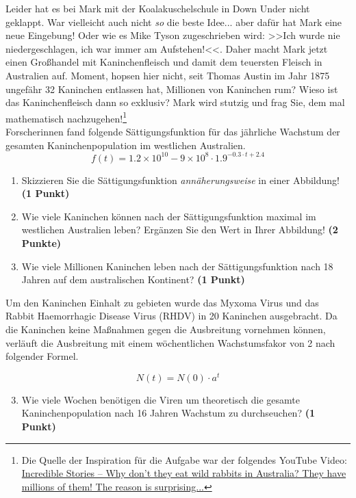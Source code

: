 \documentclass[a4paper, 9pt]{scrartcl}\usepackage[]{graphicx}\usepackage[]{xcolor}
\begin{document}
Leider hat es bei Mark mit der Koalakuschelschule in Down Under nicht geklappt. War vielleicht auch nicht \textit{so} die beste Idee... aber dafür hat Mark eine neue Eingebung! Oder wie es Mike Tyson zugeschrieben wird: >>Ich wurde nie niedergeschlagen, ich war immer am Aufstehen!<<. Daher macht Mark jetzt einen Großhandel mit Kaninchenfleisch und damit dem teuersten Fleisch in Australien auf. Moment, hopsen hier nicht, seit Thomas Austin im Jahr 1875 ungefähr 32 Kaninchen entlassen hat, Millionen von Kaninchen rum? Wieso ist das Kaninchenfleisch dann so exklusiv? Mark wird stutzig und frag Sie, dem mal mathematisch nachzugehen!\footnote{Die Quelle der Inspiration für die Aufgabe war der folgendes YouTube Video: \href{https://youtu.be/38fuOr3tdgc?si=Li7NL_FoByML8JtT}{ Incredible Stories -- Why don't they eat wild rabbits in Australia? They have    millions of them! The reason is surprising...}} \\

Forscherinnen fand folgende Sättigungsfunktion für das jährliche Wachstum der gesamten Kaninchenpopulation im westlichen Australien.
\begin{equation*}
  f(t) = \ensuremath{1.2\times 10^{10}} - \ensuremath{9\times 10^{8}} \cdot 1.9^{-0.3 \cdot t + 2.4}
\end{equation*}

\begin{enumerate}
\item Skizzieren Sie die Sättigungsfunktion \textit{annäherungsweise} in einer Abbildung! \textbf{(1 Punkt)}
\item Wie viele Kaninchen können nach der Sättigungsfunktion maximal im westlichen Australien leben? Ergänzen Sie den Wert in Ihrer Abbildung! \textbf{(2 Punkte)}
\item Wie viele Millionen Kaninchen leben nach der Sättigungsfunktion nach 18 Jahren auf dem australischen Kontinent? \textbf{(1 Punkt)}
\end{enumerate}

Um den Kaninchen Einhalt zu gebieten wurde das Myxoma Virus und das Rabbit Haemorrhagic Disease Virus (RHDV) in 20 Kaninchen ausgebracht. Da die Kaninchen keine Maßnahmen gegen die Ausbreitung vornehmen können, verläuft die Ausbreitung mit einem wöchentlichen Wachstumsfakor von 2 nach folgender Formel.

\begin{equation*}
  N(t) = N(0) \cdot a^t
\end{equation*}

\begin{enumerate}
  \setcounter{enumi}{2}
\item Wie viele Wochen benötigen die Viren um theoretisch die gesamte Kaninchenpopulation nach 16 Jahren Wachstum zu durchseuchen? \textbf{(1 Punkt)}
\end{enumerate}
\end{document}
